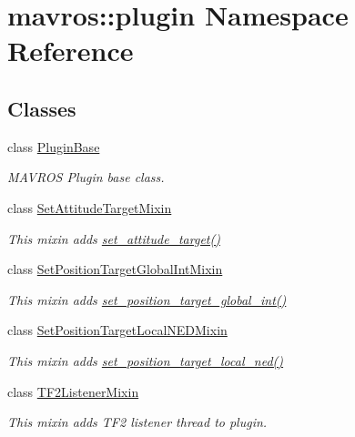 \hypertarget{namespacemavros_1_1plugin}{}\section{mavros\+::plugin Namespace Reference}
\label{namespacemavros_1_1plugin}
\subsection*{Classes}
\begin{DoxyCompactItemize}
\item 
class \mbox{\hyperlink{classmavros_1_1plugin_1_1PluginBase}{Plugin\+Base}}
\begin{DoxyCompactList}\small\item\em M\+A\+V\+R\+OS Plugin base class. \end{DoxyCompactList}\item 
class \mbox{\hyperlink{classmavros_1_1plugin_1_1SetAttitudeTargetMixin}{Set\+Attitude\+Target\+Mixin}}
\begin{DoxyCompactList}\small\item\em This mixin adds \mbox{\hyperlink{group__plugin_gac84714c4a377cd9eeef8ead08b0e8bc5}{set\+\_\+attitude\+\_\+target()}} \end{DoxyCompactList}\item 
class \mbox{\hyperlink{classmavros_1_1plugin_1_1SetPositionTargetGlobalIntMixin}{Set\+Position\+Target\+Global\+Int\+Mixin}}
\begin{DoxyCompactList}\small\item\em This mixin adds \mbox{\hyperlink{group__plugin_ga6e107096694f2c4483c9578a1a93d085}{set\+\_\+position\+\_\+target\+\_\+global\+\_\+int()}} \end{DoxyCompactList}\item 
class \mbox{\hyperlink{classmavros_1_1plugin_1_1SetPositionTargetLocalNEDMixin}{Set\+Position\+Target\+Local\+N\+E\+D\+Mixin}}
\begin{DoxyCompactList}\small\item\em This mixin adds \mbox{\hyperlink{group__plugin_ga9144d4820f4e4d8146c977ba81a59579}{set\+\_\+position\+\_\+target\+\_\+local\+\_\+ned()}} \end{DoxyCompactList}\item 
class \mbox{\hyperlink{classmavros_1_1plugin_1_1TF2ListenerMixin}{T\+F2\+Listener\+Mixin}}
\begin{DoxyCompactList}\small\item\em This mixin adds T\+F2 listener thread to plugin. \end{DoxyCompactList}\end{DoxyCompactItemize}
